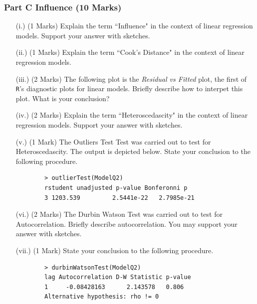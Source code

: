 \documentclass[a4paper,12pt]{article}
\begin{document}
\subsubsection*{ Part C Influence (10 Marks)}
\begin{itemize}
	\item[(i.)] (1 Marks) Explain the term ``Influence" in the context of linear regression models. Support your answer with sketches.
	\item[(ii.)] (1 Marks) Explain the  term ``Cook's Distance" in the context of linear regression models. 
	\item[(iii.)] (2 Marks) The following plot is the \textit{Residual vs Fitted} plot, the first of \texttt{R}'s diagnostic plots for linear models. Briefly describe how to interpet this plot. What is your conclusion?
	\newpage
	\item[(iv.)] (2 Marks) Explain the term ``Heteroscedascity" in the context of linear regression models. Support your answer with sketches.
	\item[(v.)] (1 Mark) The Outliers Test Test was carried out to test for Heteroscedascity. The output is depicted below. State your conclusion to the following procedure.
	
	\begin{framed}
		\begin{verbatim}
		> outlierTest(ModelQ2)
		rstudent unadjusted p-value Bonferonni p
		3 1203.539         2.5441e-22   2.7985e-21
		\end{verbatim}
	\end{framed}
	
	\item[(vi.)] (2 Marks)  The Durbin Watson Test was carried out to test for Autocorrelation. Briefly describe autocorrelation. You may support your answer with sketches.
	\item[(vii.)] (1 Mark) State your conclusion to the following procedure.
	\begin{framed}
		\begin{verbatim}
		> durbinWatsonTest(ModelQ2)
		lag Autocorrelation D-W Statistic p-value
		1     -0.08428163      2.143578   0.806
		Alternative hypothesis: rho != 0
		\end{verbatim}
	\end{framed}
	
\end{itemize}
\end{document}
